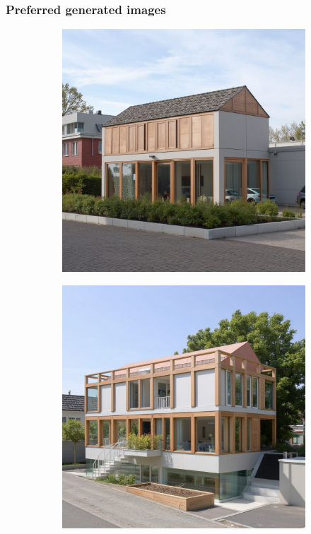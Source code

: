\subsubsection{Preferred generated images}
\begin{figure}[H]
    \centering
    \begin{subfigure}[b]{0.3\textwidth}
        \centering
        \includegraphics[width=\textwidth]{Images/Results/Architect B/3. Presentation phase/Met_lora_00071_.png}
        \caption{}
        \label{fig:B-presentation-preferred-a}
    \end{subfigure}
    \hfill
    \begin{subfigure}[b]{0.3\textwidth}
        \centering
        \includegraphics[width=\textwidth]{Images/Results/Architect B/3. Presentation phase/Met_lora_00073_.png}

\end{subfigure}
\end{figure}
